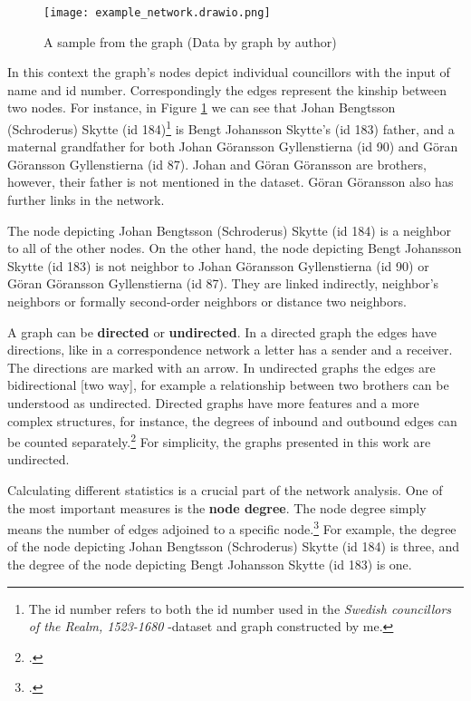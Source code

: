\begin{figure}
	\texttt{[image: example\_network.drawio.png]}
	\centering
	\caption[A sample from the graph]{A sample from the graph (Data by \cite{councillorsDS} graph by author)} 
	\centering
	\label{samplegraph}
\end{figure}
In this context the graph's nodes depict individual councillors with the input of name and id number. Correspondingly the edges represent the kinship between two nodes. For instance, in Figure \ref{samplegraph} we can see that Johan Bengtsson (Schroderus) Skytte (id 184)\footnote{The id number refers to both the id number used in the \textit{Swedish councillors of the Realm, 1523-1680} -dataset and graph constructed by me.} is Bengt Johansson Skytte's (id 183) father, and a maternal grandfather for both Johan Göransson Gyllenstierna (id 90) and Göran Göransson Gyllenstierna (id 87). Johan and Göran Göransson are brothers, however, their father is not mentioned in the dataset. Göran Göransson also has further links in the network.

The node depicting Johan Bengtsson (Schroderus) Skytte (id 184) is a neighbor to all of the other nodes. On the other hand, the node depicting Bengt Johansson Skytte (id 183) is not neighbor to Johan Göransson Gyllenstierna (id 90) or Göran Göransson Gyllenstierna (id 87). They are linked indirectly, neighbor's neighbors or formally second-order neighbors or distance two neighbors. 

A graph can be \textbf{directed} or \textbf{undirected}. In a directed graph the edges have directions, like in a correspondence network a letter has a sender and a receiver. The directions are marked with an arrow. In undirected graphs the edges are bidirectional [two way], for example a relationship between two brothers can be understood as undirected. Directed graphs have more features and a more complex structures, for instance, the degrees of inbound and outbound edges can be counted separately.\footcite[pp. 1-2.]{RajPM2018} For simplicity, the graphs presented in this work are undirected.

Calculating different statistics is a crucial part of the network analysis. One of the most important measures is the \textbf{node degree}. The node degree simply means the number of edges adjoined to a specific node.\footcite[pp. 2-3.]{RajPM2018} For example, the degree of the node depicting Johan Bengtsson (Schroderus) Skytte (id 184) is three, and the degree of the node depicting Bengt Johansson Skytte (id 183) is one. 

